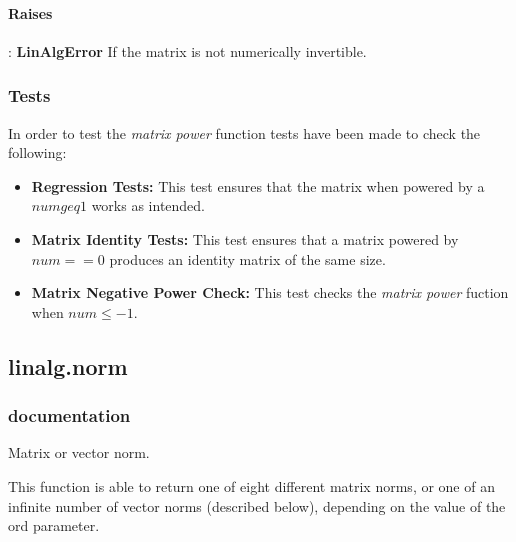 \documentclass[a4paper,11pt]{article}
\begin{document}
\paragraph{Raises}:	\textbf{LinAlgError} If the matrix is not numerically invertible.

\subsubsection{Tests}
In order to test the \textit{matrix power} function tests have been made to check the following:

\begin{itemize}
	\item \textbf{Regression Tests:} This test ensures that the matrix when powered by a $ num  geq  1 $ works as intended.
	\item \textbf{Matrix Identity Tests:} This test ensures that a matrix powered by $ num  ==  0 $ produces an identity matrix of the same size. 
	\item \textbf{Matrix Negative Power Check:} This test checks the \emph{matrix power} fuction when $ num  \leq  -1 $.
\end{itemize}



\subsection{linalg.norm}
\subsubsection{documentation}
Matrix or vector norm.

This function is able to return one of eight different matrix norms, or one of an infinite number of vector norms (described below), depending on the value of the ord parameter.\\
\end{document}
